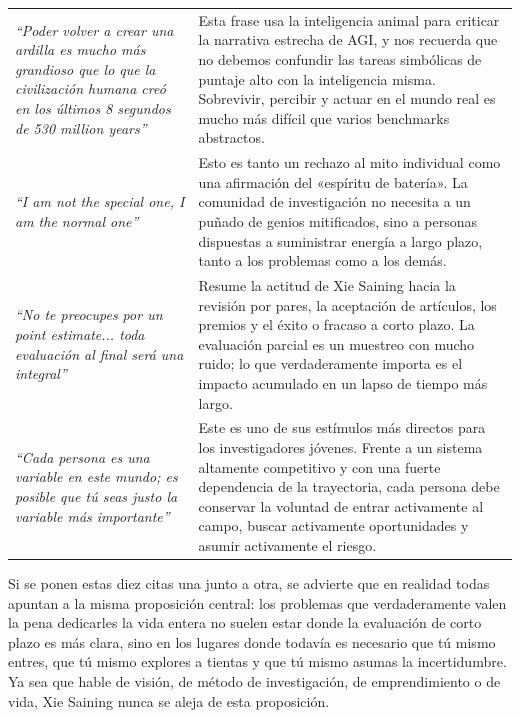 \documentclass[a4paper,12pt]{article}
\begin{document}
\begin{longtable}{>{\raggedright\arraybackslash}p{} >{\raggedright\arraybackslash}p{}}
\textit{``Poder volver a crear una ardilla es mucho más grandioso que lo que la civilización humana creó en los últimos 8 segundos de 530 million years''} & Esta frase usa la inteligencia animal para criticar la narrativa estrecha de AGI, y nos recuerda que no debemos confundir las tareas simbólicas de puntaje alto con la inteligencia misma. Sobrevivir, percibir y actuar en el mundo real es mucho más difícil que varios benchmarks abstractos. \\
\textit{``I am not the special one, I am the normal one''} & Esto es tanto un rechazo al mito individual como una afirmación del «espíritu de batería». La comunidad de investigación no necesita a un puñado de genios mitificados, sino a personas dispuestas a suministrar energía a largo plazo, tanto a los problemas como a los demás. \\
\textit{``No te preocupes por un point estimate... toda evaluación al final será una integral''} & Resume la actitud de Xie Saining hacia la revisión por pares, la aceptación de artículos, los premios y el éxito o fracaso a corto plazo. La evaluación parcial es un muestreo con mucho ruido; lo que verdaderamente importa es el impacto acumulado en un lapso de tiempo más largo. \\
\textit{``Cada persona es una variable en este mundo; es posible que tú seas justo la variable más importante''} & Este es uno de sus estímulos más directos para los investigadores jóvenes. Frente a un sistema altamente competitivo y con una fuerte dependencia de la trayectoria, cada persona debe conservar la voluntad de entrar activamente al campo, buscar activamente oportunidades y asumir activamente el riesgo. \\
\bottomrule
\end{longtable}

Si se ponen estas diez citas una junto a otra, se advierte que en realidad todas apuntan a la misma proposición central: los problemas que verdaderamente valen la pena dedicarles la vida entera no suelen estar donde la evaluación de corto plazo es más clara, sino en los lugares donde todavía es necesario que tú mismo entres, que tú mismo explores a tientas y que tú mismo asumas la incertidumbre. Ya sea que hable de visión, de método de investigación, de emprendimiento o de vida, Xie Saining nunca se aleja de esta proposición.
\end{document}
